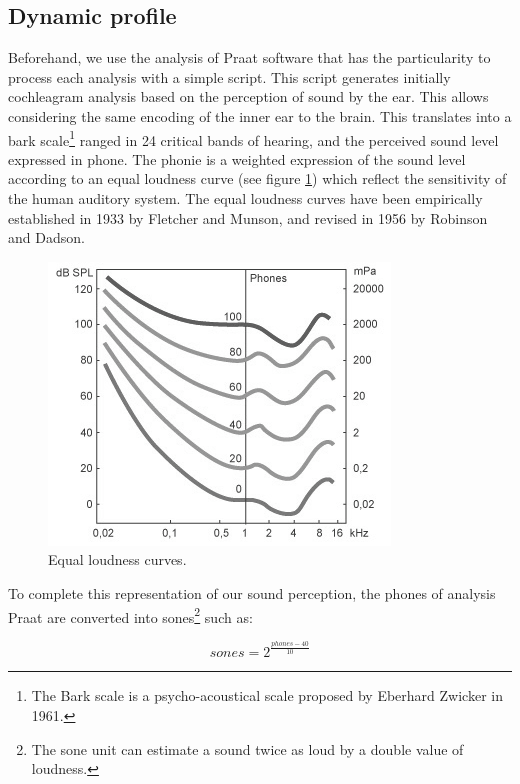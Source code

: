 \subsection{Dynamic profile}

Beforehand, we use the analysis of Praat software that has the particularity to process each analysis with a simple script. This script generates initially cochleagram analysis based on the perception of sound by the ear. This allows considering the same encoding of the inner ear to the brain. This translates into a bark scale\footnote{The Bark scale is a psycho-acoustical scale proposed by Eberhard Zwicker in 1961.} ranged in 24 critical bands of hearing, and the perceived sound level expressed in phone. The phonie is a weighted expression of the sound level according to an equal loudness curve (see figure \ref{fig:psycho}) which reflect the sensitivity of the human auditory system. The equal loudness curves have been empirically established in 1933 by Fletcher and Munson, and revised in 1956 by Robinson and Dadson.

\begin{figure}[!hbt]
	\begin{center}
		\includegraphics[scale=0.6]{img/5629}
		\caption{Equal loudness curves.}
		\label{fig:psycho}
	\end{center}
\end{figure}

To complete this representation of our sound perception, the phones of analysis Praat are converted into sones\footnote{The sone unit can estimate a sound twice as loud by a double value of loudness.} such as: 

\begin{equation}
sones= 2^{\frac{phones-40}{10}} \nonumber
\end{equation}

